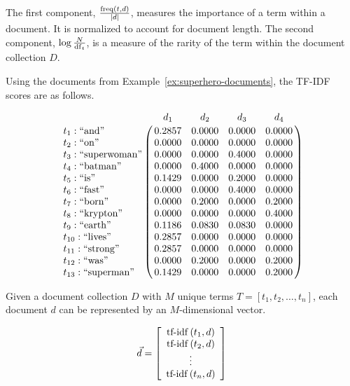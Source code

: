 		\begin{remark}
			The first component, $\frac{\operatorname{freq}\left(t, d\right)}{\mid d \mid}$, measures the importance of a term within a document.  It is normalized to account for document length.  The second component, $\log{\frac{N}{\operatorname{df}_t}}$, is a measure of the rarity of the term within the document collection $D$.
		\end{remark}
		
		\begin{ex}
			Using the documents from Example~\ref{ex:superhero-documents}, the TF-IDF scores are as follows.
			
			$$\bordermatrix{
				~ & d_1 & d_2 & d_3 & d_4 \cr
				t_1 : \textrm{``and''} & 0.2857 & 0.0000 & 0.0000 & 0.0000 \cr
				t_2 : \textrm{``on''} & 0.0000 & 0.0000 & 0.0000 & 0.0000 \cr
				t_3 : \textrm{``superwoman''} & 0.0000 & 0.0000 & 0.4000 & 0.0000 \cr
				t_4 : \textrm{``batman''} & 0.0000 & 0.4000 & 0.0000 & 0.0000 \cr
				t_5 : \textrm{``is''} & 0.1429 & 0.0000 & 0.2000 & 0.0000 \cr
				t_6 : \textrm{``fast''} & 0.0000 & 0.0000 & 0.4000 & 0.0000 \cr
				t_7 : \textrm{``born''} & 0.0000 & 0.2000 & 0.0000 & 0.2000 \cr
				t_8 : \textrm{``krypton''} & 0.0000 & 0.0000 & 0.0000 & 0.4000 \cr
				t_9 : \textrm{``earth''} & 0.1186 & 0.0830 & 0.0830 & 0.0000 \cr
				t_{10} : \textrm{``lives''} & 0.2857 & 0.0000 & 0.0000 & 0.0000 \cr
				t_{11} : \textrm{``strong''} & 0.2857 & 0.0000 & 0.0000 & 0.0000 \cr
				t_{12} : \textrm{``was''} & 0.0000 & 0.2000 & 0.0000 & 0.2000 \cr
				t_{13} : \textrm{``superman''} & 0.1429 & 0.0000 & 0.0000 & 0.2000 \cr
			}$$
		\end{ex}

		\begin{defn}
			Given a document collection $D$ with $M$ unique terms $T = \left[ t_1, t_2, \dotsc, t_n \right]$, each document $d$ can be represented by an $M$-dimensional vector.
			
			$$
				\vec{d} = 
				\left[
				\begin{array}{c}
					\operatorname{tf-idf}\left(t_1, d\right) \\
					\operatorname{tf-idf}\left(t_2, d\right) \\
					\vdots \\
					\operatorname{tf-idf}\left(t_n, d\right)
				\end{array}
				\right]
			$$
		\end{defn}
		
